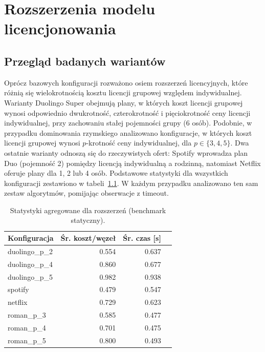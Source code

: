 \chapter{Rozszerzenia modelu licencjonowania}\label{chap:extensions}

\section{Przegląd badanych wariantów}
Oprócz bazowych konfiguracji rozważono osiem rozszerzeń licencyjnych, które różnią się wielokrotnością kosztu licencji grupowej względem indywidualnej. Warianty Duolingo Super obejmują plany, w których koszt licencji grupowej wynosi odpowiednio dwukrotność, czterokrotność i pięciokrotność ceny licencji indywidualnej, przy zachowaniu stałej pojemności grupy (6 osób). Podobnie, w przypadku dominowania rzymskiego analizowano konfiguracje, w których koszt licencji grupowej wynosi $p$-krotność ceny indywidualnej, dla $p \in \{3, 4, 5\}$. Dwa ostatnie warianty odnoszą się do rzeczywistych ofert: Spotify wprowadza plan Duo (pojemność 2) pomiędzy licencją indywidualną a rodzinną, natomiast Netflix oferuje plany dla 1, 2 lub 4 osób. Podstawowe statystyki dla wszystkich konfiguracji zestawiono w tabeli~\ref{tab:ext-overall-static}. W każdym przypadku analizowano ten sam zestaw algorytmów, pomijając obserwacje z timeout.

\begin{table}[H]
  \centering
  \caption{Statystyki agregowane dla rozszerzeń (benchmark statyczny).}
  \label{tab:ext-overall-static}
  \begin{tabular}{lrrr}
    \toprule
    \textbf{Konfiguracja} & \textbf{Śr. koszt/węzeł} & \textbf{Śr. czas [s]} \\
    \midrule
    duolingo\_p\_2        & 0.554                    & 0.637                 \\
    duolingo\_p\_4        & 0.860                    & 0.677                 \\
    duolingo\_p\_5        & 0.982                    & 0.938                 \\
    spotify               & 0.479                    & 0.547                 \\
    netflix               & 0.729                    & 0.623                 \\
    roman\_p\_3           & 0.585                    & 0.477                 \\
    roman\_p\_4           & 0.701                    & 0.475                 \\
    roman\_p\_5           & 0.800                    & 0.493                 \\
  \end{tabular}
\end{table}

